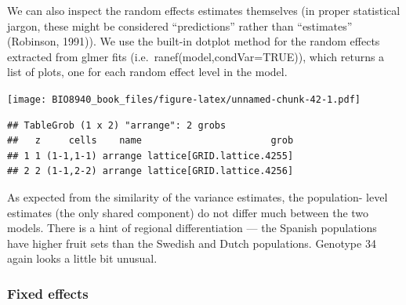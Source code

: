 \documentclass[
  12pt,
]{book}
\newenvironment{Shaded}{\begin{snugshade}}{\end{snugshade}}
\newcommand{\DataTypeTok}[1]{\textcolor[rgb]{0.13,0.29,0.53}{#1}}
\newcommand{\DecValTok}[1]{\textcolor[rgb]{0.00,0.00,0.81}{#1}}
\newcommand{\KeywordTok}[1]{\textcolor[rgb]{0.13,0.29,0.53}{\textbf{#1}}}
\newcommand{\NormalTok}[1]{#1}
\newcommand{\OperatorTok}[1]{\textcolor[rgb]{0.81,0.36,0.00}{\textbf{#1}}}
\newcommand{\OtherTok}[1]{\textcolor[rgb]{0.56,0.35,0.01}{#1}}
\newcommand{\StringTok}[1]{\textcolor[rgb]{0.31,0.60,0.02}{#1}}
\begin{document}
We can also inspect the random effects estimates themselves (in proper statistical jargon, these might be considered ``predictions'' rather than ``estimates'' (Robinson, 1991)). We use the built-in dotplot method for the random effects extracted from glmer fits (i.e.~ranef(model,condVar=TRUE)), which returns a list of plots, one for each random effect level in the model.

\begin{Shaded}
\end{Shaded}

\texttt{[image: BIO8940\_book\_files/figure-latex/unnamed-chunk-42-1.pdf]}

\begin{verbatim}
## TableGrob (1 x 2) "arrange": 2 grobs
##   z     cells    name                       grob
## 1 1 (1-1,1-1) arrange lattice[GRID.lattice.4255]
## 2 2 (1-1,2-2) arrange lattice[GRID.lattice.4256]
\end{verbatim}

As expected from the similarity of the variance estimates, the population- level estimates (the only shared component) do not differ much between the two models. There is a hint of regional differentiation --- the Spanish populations have higher fruit sets than the Swedish and Dutch populations. Genotype 34 again looks a little bit unusual.

\hypertarget{fixed-effects}{%
\subsubsection{Fixed effects}\label{fixed-effects}}
\end{document}
